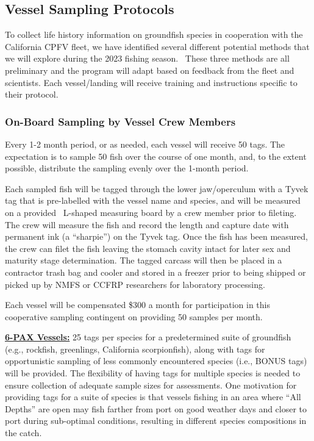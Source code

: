\documentclass[
  letterpaper,
  DIV=11,
  numbers=noendperiod]{scrartcl}
\begin{document}
\hypertarget{vessel-sampling-protocols}{%
\subsection{Vessel Sampling Protocols}\label{vessel-sampling-protocols}}

To collect life history information on groundfish species in cooperation
with the California CPFV fleet, we have identified several different
potential methods that we will explore during the 2023 fishing season.~
These three methods are all preliminary and the program will adapt based
on feedback from the fleet and scientists. Each vessel/landing will
receive training and instructions specific to their protocol.

\hypertarget{on-board-sampling-by-vessel-crew-members}{%
\subsubsection{On-Board Sampling by Vessel Crew
Members}\label{on-board-sampling-by-vessel-crew-members}}

Every 1-2 month period, or as needed, each vessel will receive 50 tags.
The expectation is to sample 50 fish over the course of one month, and,
to the extent possible, distribute the sampling evenly over the 1-month
period.

Each sampled fish will be tagged through the lower jaw/operculum with a
Tyvek tag that is pre-labelled with the vessel name and species, and
will be measured on a provided~ L-shaped measuring board by a crew
member prior to fileting. The crew will measure the fish and record the
length and capture date with permanent ink (a ``sharpie'') on the Tyvek
tag. Once the fish has been measured, the crew can filet the fish
leaving the stomach cavity intact for later sex and maturity stage
determination. The tagged carcass will then be placed in a contractor
trash bag and cooler and stored in a freezer prior to being shipped or
picked up by NMFS or CCFRP researchers for laboratory processing.

Each vessel will be compensated \$300 a month for participation in this
cooperative sampling contingent on providing 50 samples per month.

\href{https://drive.google.com/file/d/1OFiml_G4lwsWu2RsiYxac2mk8eRYo7p9/view?usp=sharing}{\textbf{6-PAX
Vessels:}} 25 tags per species for a predetermined suite of groundfish
(e.g., rockfish, greenlings, California scorpionfish), along with tags
for opportunistic sampling of less commonly encountered species (i.e.,
BONUS tags) will be provided. The flexibility of having tags for
multiple species is needed to ensure collection of adequate sample sizes
for assessments. One motivation for providing tags for a suite of
species is that vessels fishing in an area where ``All Depths'' are open
may fish farther from port on good weather days and closer to port
during sub-optimal conditions, resulting in different species
compositions in the catch.
\end{document}
